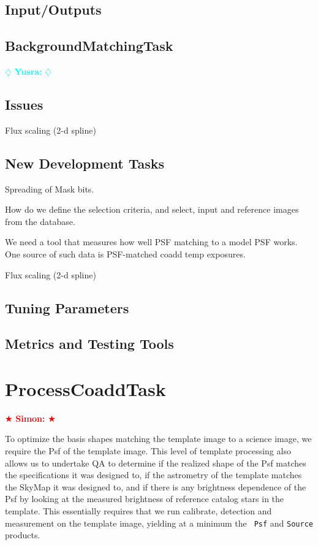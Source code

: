 \documentclass[12pt]{article}
\newcommand{\simon} { \textcolor{red} {
\ensuremath{\bigstar} {\bf Simon:}  
\ensuremath{\bigstar} } }
\newcommand{\yusra} { \textcolor{cyan} {
\ensuremath{\diamondsuit} {\bf Yusra:}  
\ensuremath{\diamondsuit} } }
\begin{document}
\subsection{Input/Outputs}

\subsection{BackgroundMatchingTask} \yusra

\subsection{Issues}

Flux scaling (2-d spline)

\subsection{New Development Tasks}
Spreading of Mask bits.  

How do we define the selection criteria, and select, input and
reference images from the database.

We need a tool that measures how well PSF matching to a model PSF
works. One source of such data is PSF-matched coadd temp exposures.

Flux scaling (2-d spline)

\subsection{Tuning Parameters}

\subsection{Metrics and Testing Tools}


\clearpage 
\section{ProcessCoaddTask} \simon

To optimize the basis shapes matching the template image to a science
image, we require the Psf of the template image.  This level of
template processing also allows us to undertake QA to determine if the
realized shape of the Psf matches the specifications it was designed
to, if the astrometry of the template matches the SkyMap it was
designed to, and if there is any brightness dependence of the Psf by
looking at the measured brightness of reference catalog stars in the
template.  This essentially requires that we run calibrate, detection
and measurement on the template image, yielding at a minimum the {\tt
  Psf} and {\tt Source} products.
\end{document}
